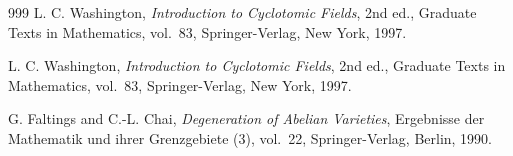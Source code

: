 \begin{thebibliography}{999}
L. C. Washington, \emph{Introduction to Cyclotomic Fields}, 2nd ed., Graduate Texts in Mathematics, vol.~83, Springer-Verlag, New York, 1997.

L. C. Washington, \emph{Introduction to Cyclotomic Fields}, 2nd ed., Graduate Texts in Mathematics, vol.~83, Springer-Verlag, New York, 1997.


G. Faltings and C.-L. Chai, \emph{Degeneration of Abelian Varieties},
Ergebnisse der Mathematik und ihrer Grenzgebiete (3), vol.~22,
Springer-Verlag, Berlin, 1990.



\end{thebibliography}

